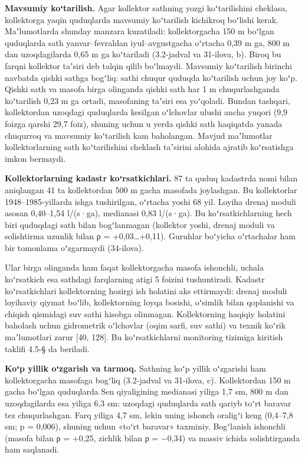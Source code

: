 \textbf{Mavsumiy koʻtarilish.} Agar kollektor sathning yozgi
koʻtarilishini cheklasa, kollektorga yaqin quduqlarda mavsumiy
koʻtarilish kichikroq boʻlishi kerak. Maʼlumotlarda shunday manzara
kuzatiladi: kollektorgacha 150 m boʻlgan quduqlarda sath
yanvar--fevraldan iyul--avgustgacha oʻrtacha 0,39 m ga, 800 m dan
uzoqdagilarda 0,65 m ga koʻtariladi (3.2-jadval va 31-ilova, b). Biroq
bu farqni kollektor taʼsiri deb talqin qilib boʻlmaydi. Mavsumiy
koʻtarilish birinchi navbatda qishki sathga bogʻliq: sathi chuqur
quduqda koʻtarilish uchun joy koʻp. Qishki sath va masofa birga
olinganda qishki sath har 1 m chuqurlashganda koʻtarilish 0,23 m ga
ortadi, masofaning taʼsiri esa yoʻqoladi. Bundan tashqari, kollektordan
uzoqdagi quduqlarda kesilgan oʻlchovlar ulushi ancha yuqori (9,9 foizga
qarshi 29,7 foiz), shuning uchun u yerda qishki sath haqiqatda yanada
chuqurroq va mavsumiy koʻtarilish kam baholangan. Mavjud maʼlumotlar
kollektorlarning sath koʻtarilishini cheklash taʼsirini alohida ajratib
koʻrsatishga imkon bermaydi.

\textbf{Kollektorlarning kadastr koʻrsatkichlari.} 87 ta quduq kadastrda
nomi bilan aniqlangan 41 ta kollektordan 500 m gacha masofada
joylashgan. Bu kollektorlar 1948--1985-yillarda ishga tushirilgan,
oʻrtacha yoshi 68 yil. Loyiha drenaj moduli asosan 0,40--1,54 l/(s·ga),
medianasi 0,83 l/(s·ga). Bu koʻrsatkichlarning hech biri quduqdagi sath
bilan bogʻlanmagan (kollektor yoshi, drenaj moduli va solishtirma
uzunlik bilan ρ = +0,03\ldots+0,11). Guruhlar boʻyicha oʻrtachalar ham
bir tomonlama oʻzgarmaydi (34-ilova).

Ular birga olinganda ham faqat kollektorgacha masofa ishonchli, uchala
koʻrsatkich esa sathdagi farqlarning atigi 5 foizini tushuntiradi.
Kadastr koʻrsatkichlari kollektorning hozirgi ish holatini aks
ettirmaydi: drenaj moduli loyihaviy qiymat boʻlib, kollektorning loyqa
bosishi, oʻsimlik bilan qoplanishi va chiqish qismidagi suv sathi
hisobga olinmagan. Kollektorning haqiqiy holatini baholash uchun
gidrometrik oʻlchovlar (oqim sarfi, suv sathi) va texnik koʻrik
maʼlumotlari zarur {[}40, 128{]}. Bu koʻrsatkichlarni monitoring
tizimiga kiritish taklifi 4.5-§ da beriladi.

\textbf{Koʻp yillik oʻzgarish va tarmoq.} Sathning koʻp yillik
oʻzgarishi ham kollektorgacha masofaga bogʻliq (3.2-jadval va 31-ilova,
c). Kollektordan 150 m gacha boʻlgan quduqlarda Sen qiyaligining
medianasi yiliga 1,7 sm, 800 m dan uzoqdagilarda esa yiliga 6,3 sm:
uzoqdagi quduqlarda sath qariyb toʻrt baravar tez chuqurlashgan. Farq
yiliga 4,7 sm, lekin uning ishonch oraligʻi keng (0,4--7,8 sm; p =
0,006), shuning uchun «toʻrt baravar» taxminiy. Bogʻlanish ishonchli
(masofa bilan ρ = +0,25, zichlik bilan ρ = −0,34) va massiv ichida
solishtirganda ham saqlanadi.

